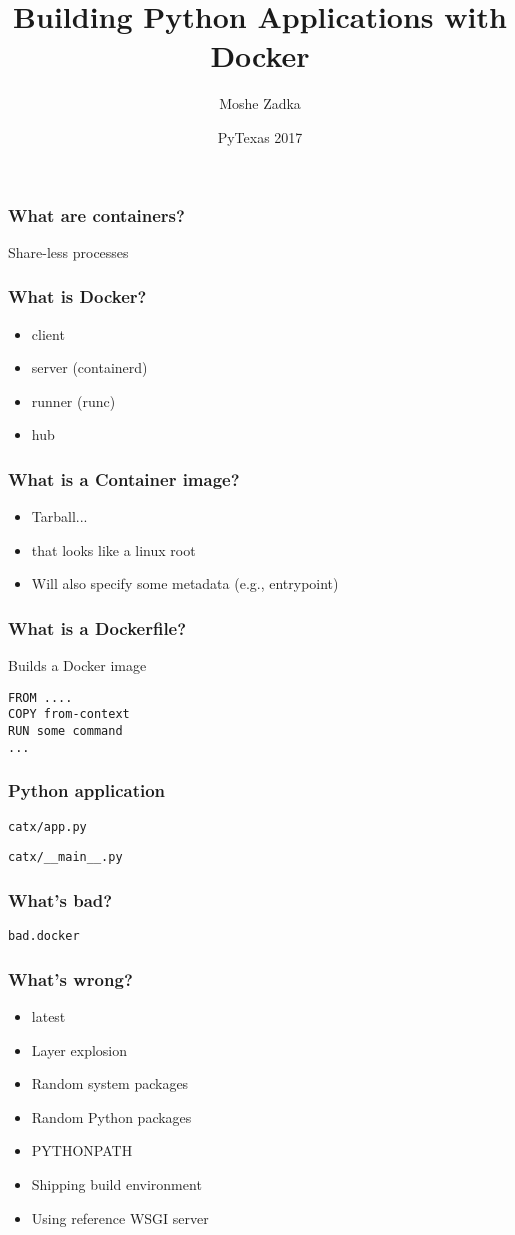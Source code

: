 \documentclass{beamer}
\title{Building Python Applications with Docker}
\author{Moshe Zadka}
\date{PyTexas 2017}
\begin{document}
 
\frame{\titlepage}

\begin{frame}[fragile]
\frametitle{What are containers?}
Share-less processes
\end{frame}

\begin{frame}[fragile]
\frametitle{What is Docker?}
\begin{itemize}
\item client \pause
\item server (containerd) \pause
\item runner (runc) \pause
\item hub
\end{itemize}
\end{frame}

\begin{frame}[fragile]
\frametitle{What is a Container image?}
\begin{itemize}
\item Tarball... \pause
\item that looks like a linux root \pause
\item Will also specify some metadata (e.g., entrypoint)
\end{itemize}
\end{frame}

\begin{frame}[fragile]
\frametitle{What is a Dockerfile?}
Builds a Docker image
\begin{lstlisting}
FROM ....
COPY from-context
RUN some command
...
\end{lstlisting}
\end{frame}

\begin{frame}[fragile]
\frametitle{Python application}
\verb|catx/app.py|

\verb|catx/__main__.py|

\end{frame}

\begin{frame}[fragile]
\frametitle{What's bad?}
\verb|bad.docker|

\end{frame}

\begin{frame}[fragile]
\frametitle{What's wrong?}
\begin{itemize}
\item latest \pause
\item Layer explosion \pause
\item Random system packages \pause
\item Random Python packages \pause
\item PYTHONPATH \pause
\item Shipping build environment \pause
\item Using reference WSGI server
\end{itemize}
\end{frame}
\end{document}
